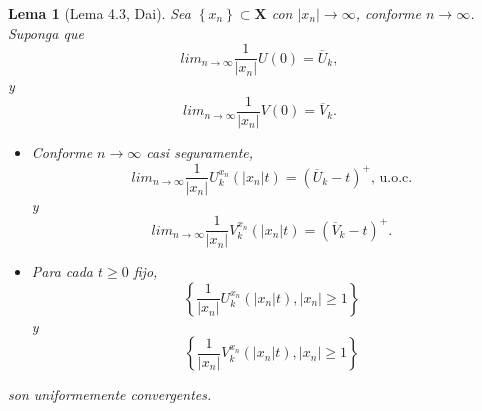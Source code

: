 \documentclass{article}
\newtheorem{Lema}{Lema}[section]
\numberwithin{equation}{section}
\begin{document}
\begin{Lema}[Lema 4.3, Dai\cite{Dai}]\label{Lema.4.3}
Sea $\left\{x_{n}\right\}\subset \mathbf{X}$ con
$|x_{n}|\rightarrow\infty$, conforme $n\rightarrow\infty$. Suponga
que
\[lim_{n\rightarrow\infty}\frac{1}{|x_{n}|}U\left(0\right)=\overline{U}_{k},\]
y
\[lim_{n\rightarrow\infty}\frac{1}{|x_{n}|}V\left(0\right)=\overline{V}_{k}.\]
\begin{itemize}
\item[a)] Conforme $n\rightarrow\infty$ casi seguramente,
\[lim_{n\rightarrow\infty}\frac{1}{|x_{n}|}U^{x_{n}}_{k}\left(|x_{n}|t\right)=\left(\overline{U}_{k}-t\right)^{+}\textrm{, u.o.c.}\]
y
\[lim_{n\rightarrow\infty}\frac{1}{|x_{n}|}V^{x_{n}}_{k}\left(|x_{n}|t\right)=\left(\overline{V}_{k}-t\right)^{+}.\]

\item[b)] Para cada $t\geq0$ fijo,
\[\left\{\frac{1}{|x_{n}|}U^{x_{n}}_{k}\left(|x_{n}|t\right),|x_{n}|\geq1\right\}\]
y
\[\left\{\frac{1}{|x_{n}|}V^{x_{n}}_{k}\left(|x_{n}|t\right),|x_{n}|\geq1\right\}\]
\end{itemize}
son uniformemente convergentes.
\end{Lema}
\end{document}
